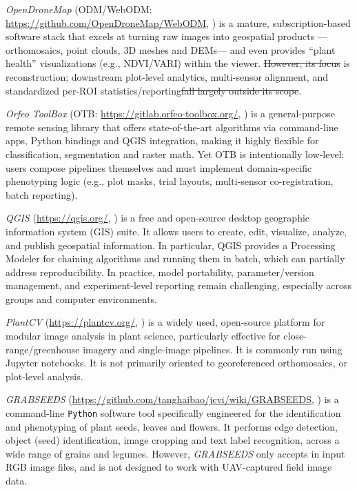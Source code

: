 \documentclass[drones,technicalnote,accept,pdftex,moreauthors]{Definitions/mdpi}
\providecommand{\DIFadd}[1]{{\protect\color{blue}\uwave{#1}}} %
\providecommand{\DIFdel}[1]{{\protect\color{red}\sout{#1}}}                      %
\providecommand{\DIFaddbegin}{} %
\providecommand{\DIFaddend}{} %
\providecommand{\DIFdelbegin}{} %
\providecommand{\DIFdelend}{} %
\newcommand{\DIFscaledelfig}{0.5}
\newlength{\DIFdelgraphicswidth} %
\newlength{\DIFdelgraphicsheight} %
\newcommand{\DIFaddincludegraphics}[2][]{{\color{blue}\fbox{\DIFOincludegraphics[#1]{#2}}}} %
\newcommand{\DIFdelincludegraphics}[2][]{%
\sbox{\DIFdelgraphicsbox}{\DIFOincludegraphics[#1]{#2}}%
\settoboxwidth{\DIFdelgraphicswidth}{\DIFdelgraphicsbox} %
\settoboxtotalheight{\DIFdelgraphicsheight}{\DIFdelgraphicsbox} %
\scalebox{\DIFscaledelfig}{%
\parbox[b]{\DIFdelgraphicswidth}{\usebox{\DIFdelgraphicsbox}\\[-\baselineskip] \rule{\DIFdelgraphicswidth}{0em}}\llap{\resizebox{\DIFdelgraphicswidth}{\DIFdelgraphicsheight}{%
\setlength{\unitlength}{\DIFdelgraphicswidth}%
\begin{picture}(1,1)%
\thicklines\linethickness{2pt} %
{\color[rgb]{1,0,0}\put(0,0){\framebox(1,1){}}}%
{\color[rgb]{1,0,0}\put(0,0){\line( 1,1){1}}}%
{\color[rgb]{1,0,0}\put(0,1){\line(1,-1){1}}}%
\end{picture}%
}\hspace*{3pt}}} %
} %
\DeclareRobustCommand{\DIFaddbegin}{\DIFOaddbegin \let\includegraphics\DIFaddincludegraphics} %
\DeclareRobustCommand{\DIFaddend}{\DIFOaddend \let\includegraphics\DIFOincludegraphics} %
\DeclareRobustCommand{\DIFdelbegin}{\DIFOdelbegin \let\includegraphics\DIFdelincludegraphics} %
\DeclareRobustCommand{\DIFdelend}{\DIFOaddend \let\includegraphics\DIFOincludegraphics} %
\begin{document}
\textit{OpenDroneMap} (ODM/WebODM: \url{https://github.com/OpenDroneMap/WebODM}, \cite{vacca2020web}) is a mature, subscription-based software stack that excels at turning raw images into geospatial products —orthomosaics, point clouds, 3D meshes and DEMs— and even provides “plant health” visualizations (e.g., NDVI/VARI) within the viewer. \DIFdelbegin \DIFdel{However, its focus }\DIFdelend \DIFaddbegin \DIFadd{The focus of ODM/WebODM }\DIFaddend is reconstruction; \DIFaddbegin \DIFadd{however, it can well be used for }\DIFaddend downstream plot-level analytics, multi-sensor alignment, and standardized per-ROI statistics/reporting\DIFdelbegin \DIFdel{fall largely outside its scope}\DIFdelend .

\textit{Orfeo ToolBox} (OTB: \url{https://gitlab.orfeo-toolbox.org/}, \cite{noauthor_orfeo_nodate, grizonnet_orfeo_2017}) is a general-purpose remote sensing library that offers state-of-the-art algorithms via command-line apps, Python bindings and QGIS integration, making it highly flexible for classification, segmentation and raster math. Yet OTB is intentionally low-level: users compose pipelines themselves and must implement domain-specific phenotyping logic (e.g., plot masks, trial layouts, multi-sensor co-registration, batch reporting). 

\textit{QGIS} (\url{https://qgis.org/}, \cite{moyroud2018introduction}) is a free and open-source desktop geographic information system (GIS) suite. It allows users to create, edit, visualize, analyze, and publish geospatial information. In particular, QGIS provides a Processing Modeler \cite{dobesova2020evaluation} for chaining algorithms and running them in batch, which can partially address reproducibility. In practice, model portability, parameter/version management, and experiment-level reporting remain challenging, especially across groups and computer environments.

\textit{PlantCV} (\url{https://plantcv.org/}, \cite{noauthor_plantcv_2021}) is a widely used, open-source platform for modular image analysis in plant science, particularly effective for close-range/greenhouse imagery and single-image pipelines. It is commonly run using Jupyter notebooks. It is not primarily oriented to georeferenced orthomosaics,  or plot-level analysis.

\textit{GRABSEEDS} (\url{https://github.com/tanghaibao/jcvi/wiki/GRABSEEDS}, \cite{tang2024grabseeds}) is a command-line \texttt{Python} software tool specifically engineered for the identification and phenotyping of plant seeds, leaves and flowers.
It performs edge detection, object (seed) identification, image cropping and text label recognition, across a wide range of grains and legumes.
However, \textit{GRABSEEDS} only accepts in input RGB image files, and is not designed to work with UAV-captured field image data.
\end{document}
